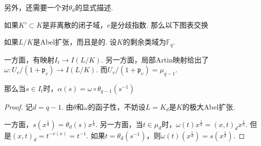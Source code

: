 另外，还需要一个对$\theta_d$的显式描述.

\begin{clem}
    如果$K'\subset K$是非离散的闭子域，$e$是分歧指数. 那么以下图表交换
    \begin{figure}[H]
        \centering
    \end{figure}
\end{clem}

\begin{cprop}
    如果$L/K$是Abel扩张，而且是\tame 的.
    设$K$的剩余类域为$\mathbb{F}_q$.

    一方面，有映射$I_t\to I(L/K)$.
    另一方面，局部Artin映射给出了$\omega: U_v/(1+\mathfrak{p}_v)\to I(L/K)$. 而$U_v/(1+\mathfrak{p}_v) = \mu_{q-1}$.

    那么当$s\in I_t$时，$\alpha(s) = \omega \circ \theta_{q-1}(s^{-1})$
    \label{surj::1.5.3}
\end{cprop}

\begin{proof}
    记$d=q-1$.
    由$\theta$和$\omega$的函子性，不妨设$L = K_d$是$K$的极大\tame Abel扩张.

    一方面，$s(x^{\frac{1}{d}}) = \theta_d(s)x^{\frac{1}{d}}$.
    另一方面，当$t\in \mu_{d}$时，$\omega(t)x^{\frac{1}{d}} = (x,t)_d x^{\frac{1}{d}}$.
    但是$(x,t)_d = t^{-v(x)}=t^{-1}$.
    如果$t=\theta_d(s^{-1})$，则$\omega(t)(x^{\frac{1}{d}}) = s(x^{\frac{1}{d}})$.
\end{proof}
